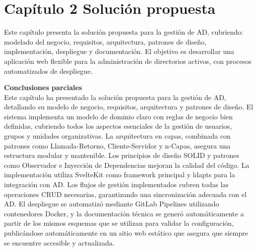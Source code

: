 \section{Capítulo 2 Solución propuesta}

Este capítulo presenta la solución propuesta para la gestión de AD, cubriendo: modelado del negocio, requisitos, arquitectura, patrones de diseño, implementación, despliegue y documentación. El objetivo es desarrollar una aplicación web flexible para la administración de directorios activos, con procesos automatizados de despliegue.










\textbf{Conclusiones parciales}\\
Este capítulo ha presentado la solución propuesta para la gestión de AD, detallando su modelo de negocio, requisitos, arquitectura y patrones de diseño. El sistema implementa un modelo de dominio claro con reglas de negocio bien definidas, cubriendo todos los aspectos esenciales de la gestión de usuarios, grupos y unidades organizativas. La arquitectura en capas, combinada con patrones como Llamada-Retorno, Cliente-Servidor y n-Capas, asegura una estructura modular y mantenible. Los principios de diseño SOLID y patrones como Observador e Inyección de Dependencias mejoran la calidad del código. La implementación utiliza SvelteKit como framework principal y ldapts para la integración con AD. Los flujos de gestión implementados cubren todas las operaciones CRUD necesarias, garantizando una sincronización adecuada con el AD. El despliegue se automatizó mediante GitLab Pipelines utilizando contenedores Docker, y la documentación técnica se generó automáticamente a partir de los mismos esquemas que se utilizan para validar la configuración, publicándose automáticamente en un sitio web estático que asegura que siempre se encuentre accesible y actualizada.

